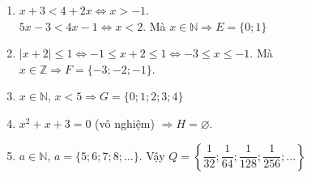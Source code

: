 \begin{bt}
{\begin{enumerate}
			\item $x+3<4+2x\Leftrightarrow x>-1$.\\ 
			$5x-3<4x-1\Leftrightarrow x<2$. Mà $x\in \mathbb{N}\Rightarrow E=\{0;1\}$ 
			\item $|x+2|\le 1\Leftrightarrow -1\le x+2\le 1\Leftrightarrow -3\le x\le  -1$. Mà $x\in \mathbb{Z}\Rightarrow F=\{-3;-2;-1\}$.
			\item $x\in\mathbb{N}$, $x<5\Rightarrow G=\{0;1;2;3;4\}$ 
			\item $x^2+x+3=0$ (vô nghiệm) $\Rightarrow  H=\varnothing$.
			\item  $a\in\mathbb{N}$, $a=\{5;6;7;8;\ldots\}$. Vậy $Q= \left\{\dfrac{1}{32};\dfrac{1}{64};\dfrac{1}{128};\dfrac{1}{256};\ldots\right\} $
		\end{enumerate}
	} 
\end{bt}

